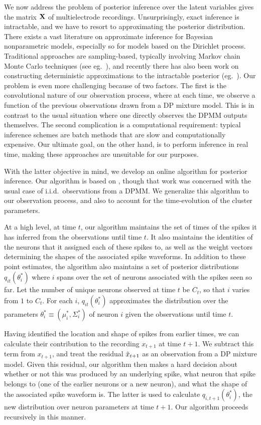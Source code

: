We now address the problem of posterior inference over the latent variables gives the matrix $\mathbf{X}$ of multielectrode recordings. Unsurprisingly, exact 
inference is intractable, and we have to resort to approximating the posterior distribution.
There exists a vast literature on approximate inference for Bayesian nonparametric models, especially so for models based on the Dirichlet process.
Traditional approaches are sampling-based, typically involving Markov chain Monte Carlo techniques (see eg.\ \citep{Nea2000, IshJam2001}), 
and recently there has also been work on constructing deterministic approximations to the intractable posterior (eg.\ \citep{BleJor2006, MinGha2003}).
Our problem is even more challenging because of two factors. The first is the convolutional nature of our observation process, where at each time,
we observe a function of the previous observations drawn from a DP mixture model. This is in contrast to the usual situation where one directly observes 
the DPMM outputs themselves.
The second complication is a computational requirement: typical inference schemes are batch methods that are slow and computationally expensive. 
Our ultimate goal, on the other hand, is to perform inference in real time, making these approaches are unsuitable for our purposes.

With the latter objective in mind, we develop an online algorithm for posterior inference. Our algorithm is based on 
\citep{WangDun2009}, though that work was concerned with the usual case of i.i.d.\ observations from a DPMM. We generalize this algorithm to our 
observation process, and also to account for the time-evolution of the cluster parameters.

At a high level, at time $t$, our algorithm maintains the set of times of the spikes it has inferred from the observations until time $t$. It also maintains
the identities of the neurons that it assigned each of these spikes to, as well as the weight vectors determining the shapes of the associated spike 
waveforms. In addition to these point estimates, the algorithm also maintains a set of posterior distributions $q_{it}(\theta^*_i)$ where $i$ spans over the
set of neurons associated with the spikes seen so far. Let the number of unique neurons observed at time $t$ be $C_t$, so that $i$ varies from $1$ to $C_t$.
For each $i$, $q_{it}(\theta^*_i)$ approximates the distribution over the parameters 
$\theta_i^* \equiv (\mu_i^*, \Sigma_i^*)$ of neuron $i$ given the observations until time $t$. 

Having identified the location and shape of spikes from earlier times, we can calculate their contribution to the recording $x_{t+1}$ at time $t+1$.
We subtract this term from $x_{t+1}$, and treat the residual $\tilde{x}_{t+1}$ as an observation from a DP mixture model.
Given this residual, our algorithm then makes a hard decision about whether or not this was produced by an underlying spike, what neuron that spike belongs 
to (one of the earlier neurons or a new neuron), and what the shape of the associated spike waveform is. The latter is used to calculate
$q_{i,t+1}(\theta^*_i)$, the new distribution over neuron parameters at time $t+1$. Our algorithm proceeds recursively in this manner. 


